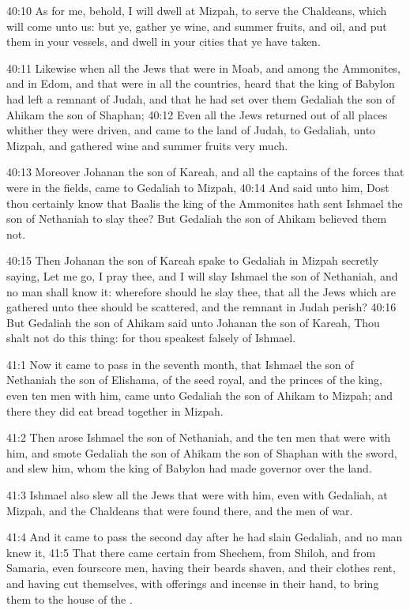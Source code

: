40:10 As for me, behold, I will dwell at Mizpah, to serve the Chaldeans, which will come unto us: but ye, gather ye wine, and summer fruits, and oil, and put them in your vessels, and dwell in your cities that ye have taken.

40:11 Likewise when all the Jews that were in Moab, and among the Ammonites, and in Edom, and that were in all the countries, heard that the king of Babylon had left a remnant of Judah, and that he had set over them Gedaliah the son of Ahikam the son of Shaphan; 40:12 Even all the Jews returned out of all places whither they were driven, and came to the land of Judah, to Gedaliah, unto Mizpah, and gathered wine and summer fruits very much.

40:13 Moreover Johanan the son of Kareah, and all the captains of the forces that were in the fields, came to Gedaliah to Mizpah, 40:14 And said unto him, Dost thou certainly know that Baalis the king of the Ammonites hath sent Ishmael the son of Nethaniah to slay thee? But Gedaliah the son of Ahikam believed them not.

40:15 Then Johanan the son of Kareah spake to Gedaliah in Mizpah secretly saying, Let me go, I pray thee, and I will slay Ishmael the son of Nethaniah, and no man shall know it: wherefore should he slay thee, that all the Jews which are gathered unto thee should be scattered, and the remnant in Judah perish?  40:16 But Gedaliah the son of Ahikam said unto Johanan the son of Kareah, Thou shalt not do this thing: for thou speakest falsely of Ishmael.

41:1 Now it came to pass in the seventh month, that Ishmael the son of Nethaniah the son of Elishama, of the seed royal, and the princes of the king, even ten men with him, came unto Gedaliah the son of Ahikam to Mizpah; and there they did eat bread together in Mizpah.

41:2 Then arose Ishmael the son of Nethaniah, and the ten men that were with him, and smote Gedaliah the son of Ahikam the son of Shaphan with the sword, and slew him, whom the king of Babylon had made governor over the land.

41:3 Ishmael also slew all the Jews that were with him, even with Gedaliah, at Mizpah, and the Chaldeans that were found there, and the men of war.

41:4 And it came to pass the second day after he had slain Gedaliah, and no man knew it, 41:5 That there came certain from Shechem, from Shiloh, and from Samaria, even fourscore men, having their beards shaven, and their clothes rent, and having cut themselves, with offerings and incense in their hand, to bring them to the house of the \LORD.

